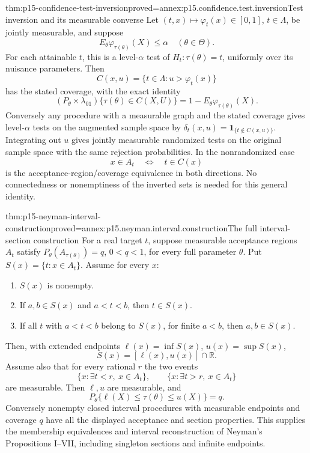 \begin{hbtheorem}{thm:p15-confidence-test-inversion}{proved=annex:p15.confidence.test.inversion}{Test inversion and its measurable converse}
Let \((t,x)\mapsto\varphi_t(x)\in[0,1]\), \(t\in\Lambda\),
be jointly measurable, and suppose
\[
                    E_\theta\varphi_{\tau(\theta)}(X)\leq\alpha
                                               \quad(\theta\in\Theta).
\]
For each attainable \(t\), this is a level-\(\alpha\) test
of \(H_t:\tau(\theta)=t\), uniformly over its nuisance parameters.
Then
\[
                  C(x,u)=\{t\in\Lambda:u>\varphi_t(x)\}
\]
has the stated coverage, with the exact identity
\[
 (P_\theta\times\lambda_{01})\{\tau(\theta)\in C(X,U)\}
                       =1-E_\theta\varphi_{\tau(\theta)}(X).
\]
Conversely any procedure with a measurable graph and
the stated coverage gives level-\(\alpha\) tests on
the augmented sample space by
\(\delta_t(x,u)=\mathbf1_{\{t\notin C(x,u)\}}\).
Integrating out \(u\) gives jointly measurable randomized
tests on the original sample space with the same rejection
probabilities. In the nonrandomized case
\[
                       x\in A_t
                            \quad\Longleftrightarrow\quad
                       t\in C(x)
\]
is the acceptance-region/coverage equivalence in both directions.
No connectedness or nonemptiness of the inverted sets
is needed for this general identity.
\end{hbtheorem}

\begin{hbtheorem}{thm:p15-neyman-interval-construction}{proved=annex:p15.neyman.interval.construction}{The full interval-section construction}
For a real target \(t\), suppose measurable acceptance
regions \(A_t\) satisfy \(P_\theta(A_{\tau(\theta)})=q\),
\(0<q<1\), for every full parameter \(\theta\).
Put \(S(x)=\{t:x\in A_t\}\).
Assume for every \(x\):
\begin{enumerate}
\item \(S(x)\) is nonempty.
\item If \(a,b\in S(x)\) and \(a<t<b\), then \(t\in S(x)\).
\item If all \(t\) with \(a<t<b\) belong to \(S(x)\), for
      finite \(a<b\), then \(a,b\in S(x)\).
\end{enumerate}
Then, with extended endpoints
\(\ell(x)=\inf S(x)\), \(u(x)=\sup S(x)\),
\[
                  S(x)=[\ell(x),u(x)]\cap\mathbb R.
\]
Assume also that for every rational \(r\) the two events
\[
 \{x:\exists t<r,\ x\in A_t\},\qquad
 \{x:\exists t>r,\ x\in A_t\}
\]
are measurable. Then \(\ell,u\) are measurable, and
\[
                      P_\theta\{\ell(X)\leq\tau(\theta)\leq u(X)\}=q.
\]
Conversely nonempty closed interval procedures with
measurable endpoints and coverage \(q\) have all the
displayed acceptance and section properties.
This supplies the membership equivalences and interval
reconstruction of Neyman's Propositions I--VII, including
singleton sections and infinite endpoints.
\end{hbtheorem}

